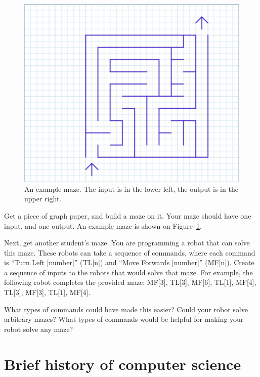 \begin{figure}
  \centering
    \includegraphics[scale=.4]{graph-paper.png}
    \caption{An example maze. The input is in the lower left, the output is in
      the upper right.}
    \label{fig:graph-paper}
\end{figure}

\begin{exercise}
  Get a piece of graph paper, and build a maze on it. Your maze should have one
  input, and one output. An example maze is shown on
  Figure~\ref{fig:graph-paper}.

  Next, get another student's maze. You are programming a robot that can solve
  this maze. These robots can take a sequence of commands, where each command is
  ``Turn Left [number]'' (TL[n]) and ``Move Forwards [number]'' (MF[n]). Create
  a sequence of inputs to the robots that would solve that maze. For example,
  the following robot completes the provided maze: MF[3], TL[3], MF[6], TL[1],
  MF[4], TL[3], MF[3], TL[1], MF[4].

  What types of commands could have made this easier? Could your robot solve
  arbitrary mazes? What types of commands would be helpful for making your robot
  solve any maze?
\end{exercise}

\section{Brief history of computer science}


